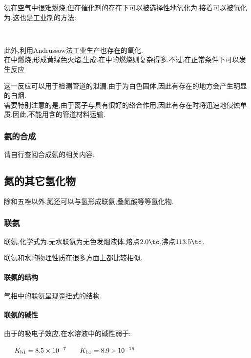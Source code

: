 \documentclass{ctexart}
\begin{document}
\indent 氨在空气中很难燃烧,但在催化剂的存在下可以被选择性地氧化为.接着可以被氧化为,这也是工业制的方法:
\begin{center}
    \\
\end{center}
此外,利用Andrussow法工业生产也存在的氧化.\\
\indent {}在中燃烧,形成黄绿色火焰,生成.在中的燃烧则复杂得多.不过,在正常条件下可以发生反应
\begin{center}
\end{center}
这一反应可以用于检测管道的泄漏.由于为白色固体,因此有存在的地方会产生明显的白烟.\\
\indent 需要特别注意的是,由于离子与具有很好的络合作用,因此有存在时将迅速地侵蚀单质.因此,不能用含的管道材料运输.
\subsubsection{氨的合成}
请自行查阅合成氨的相关内容.
\subsection{氮的其它氢化物}
除和五唑以外,氮还可以与氢形成联氨,叠氮酸等等氢化物.
\subsubsection{联氨}
\begin{substance}[\ce{N2H4}]
    联氨,化学式为.无水联氨为无色发烟液体,熔点$2.0\tc$,沸点$113.5\tc$.
\end{substance}
联氨和水的物理性质在很多方面上都比较相似.
\paragraph{联氨的结构}
气相中的联氨呈现歪扭式的结构.
\paragraph{联氨的碱性}
由于的吸电子效应,在水溶液中的碱性弱于:
\begin{center}
    \ \ \ $K_{\text b1}=8.5\times10^{-7}$
    \ \ \ $K_{\text b1}=8.9\times10^{-16}$
\end{center}
\end{document}
